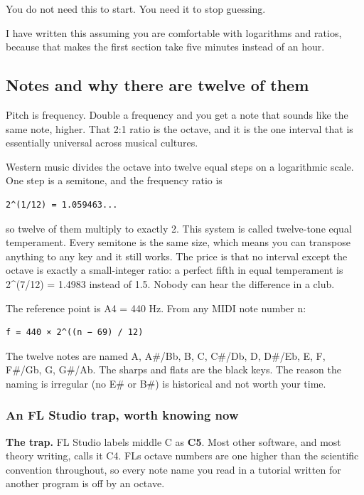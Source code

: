 You do not need this to start. You need it to stop guessing.

I have written this assuming you are comfortable with logarithms and ratios, because that
makes the first section take five minutes instead of an hour.

\subsection{Notes and why there are twelve of them}\label{th04_harmony-notes-and-why-there-are-twelve-of-them}

Pitch is frequency. Double a frequency and you get a note that sounds like the same note,
higher. That 2:1 ratio is the octave, and it is the one interval that is essentially
universal across musical cultures.

Western music divides the octave into twelve equal steps on a logarithmic scale. One step
is a semitone, and the frequency ratio is

\begin{verbatim}
2^(1/12) = 1.059463...
\end{verbatim}

so twelve of them multiply to exactly 2. This system is called twelve-tone equal
temperament. Every semitone is the same size, which means you can transpose anything to any
key and it still works. The price is that no interval except the octave is exactly a
small-integer ratio: a perfect fifth in equal temperament is 2\^{}(7/12) = 1.4983 instead of
1.5. Nobody can hear the difference in a club.

The reference point is A4 = 440 Hz. From any MIDI note number n:

\begin{verbatim}
f = 440 × 2^((n − 69) / 12)
\end{verbatim}

The twelve notes are named A, A\#/Bb, B, C, C\#/Db, D, D\#/Eb, E, F, F\#/Gb, G, G\#/Ab. The
sharps and flats are the black keys. The reason the naming is irregular (no E\# or B\#) is
historical and not worth your time.

\subsubsection{An FL Studio trap, worth knowing now}\label{th04_harmony-an-fl-studio-trap-worth-knowing-now}

\begin{pitfallbox}
\textbf{The trap.} FL Studio labels middle C as \textbf{C5}. Most other software, and most theory
writing, calls it C4. FL\textquotesingle s octave numbers are one higher than the scientific convention
throughout, so every note name you read in a tutorial written for another program is off by
an octave.
\end{pitfallbox}

